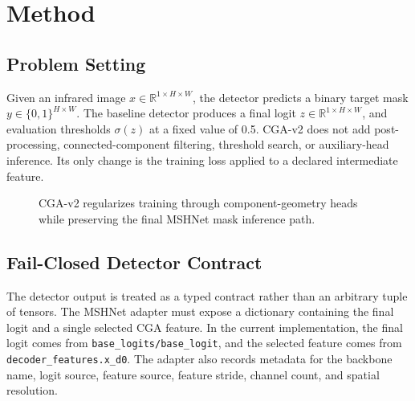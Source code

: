 \documentclass[letterpaper]{article}
\begin{document}
\section{Method}

\subsection{Problem Setting}

Given an infrared image $x \in \mathbb{R}^{1 \times H \times W}$, the detector predicts a binary target mask $y \in \{0,1\}^{H \times W}$. The baseline detector produces a final logit $z \in \mathbb{R}^{1 \times H \times W}$, and evaluation thresholds $\sigma(z)$ at a fixed value of 0.5. CGA-v2 does not add post-processing, connected-component filtering, threshold search, or auxiliary-head inference. Its only change is the training loss applied to a declared intermediate feature.

\begin{figure}[t]
\centering
{}
\caption{CGA-v2 regularizes training through component-geometry heads while preserving the final MSHNet mask inference path.}
\label{fig:pipeline}
\end{figure}

\subsection{Fail-Closed Detector Contract}

The detector output is treated as a typed contract rather than an arbitrary tuple of tensors. The MSHNet adapter must expose a dictionary containing the final logit and a single selected CGA feature. In the current implementation, the final logit comes from \texttt{base\_logits/base\_logit}, and the selected feature comes from \texttt{decoder\_features.x\_d0}. The adapter also records metadata for the backbone name, logit source, feature source, feature stride, channel count, and spatial resolution.
\end{document}
